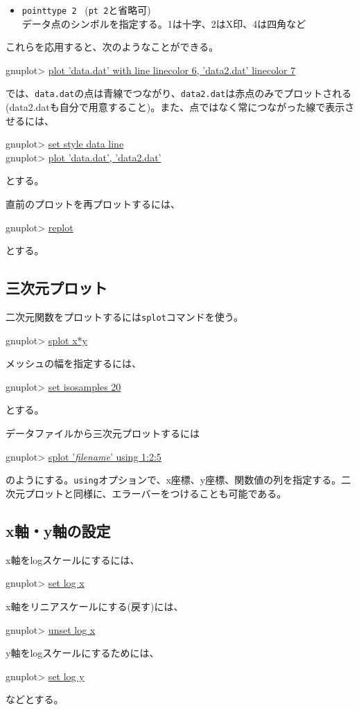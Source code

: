 {\begin{itemize}
\item {\tt pointtype 2} \ ({\tt pt 2}と省略可) \\
  データ点のシンボルを指定する。1は十字、2はX印、4は四角など
\end{itemize}
これらを応用すると、次のようなことができる。
\begin{commandline2}
gnuplot> \underline{plot 'data.dat' with line linecolor 6, 'data2.dat' linecolor 7}
\end{commandline2} \noindent
では、{\tt data.dat}の点は青線でつながり、{\tt data2.dat}は赤点のみでプロットされる(data2.datも自分で用意すること)。また、点ではなく常につながった線で表示させるには、
\begin{commandline2}
gnuplot> \underline{set style data line}\\
gnuplot> \underline{plot 'data.dat', 'data2.dat'}
\end{commandline2} \noindent
とする。

直前のプロットを再プロットするには、
\begin{commandline2}
gnuplot> \underline{replot}
\end{commandline2} \noindent
とする。

\subsection{三次元プロット}

二次元関数をプロットするには{\tt splot}コマンドを使う。
\begin{commandline2}
gnuplot> \underline{splot x*y}
\end{commandline2} \noindent
メッシュの幅を指定するには、
\begin{commandline2}
gnuplot> \underline{set isosamples 20}
\end{commandline2} \noindent
とする。

データファイルから三次元プロットするには
\begin{commandline2}
gnuplot> \underline{splot '{\it filename}' using 1:2:5}
\end{commandline2} \noindent
のようにする。{\tt using}オプションで、x座標、y座標、関数値の列を指定する。二次元プロットと同様に、エラーバーをつけることも可能である。

\subsection{x軸・y軸の設定}

x軸をlogスケールにするには、
\begin{commandline2}
gnuplot> \underline{set log x}
\end{commandline2} \noindent
x軸をリニアスケールにする(戻す)には、
\begin{commandline2}
gnuplot> \underline{unset log x}
\end{commandline2} \noindent
y軸をlogスケールにするためには、
\begin{commandline2}
gnuplot> \underline{set log y}
\end{commandline2} \noindent
などとする。

}
